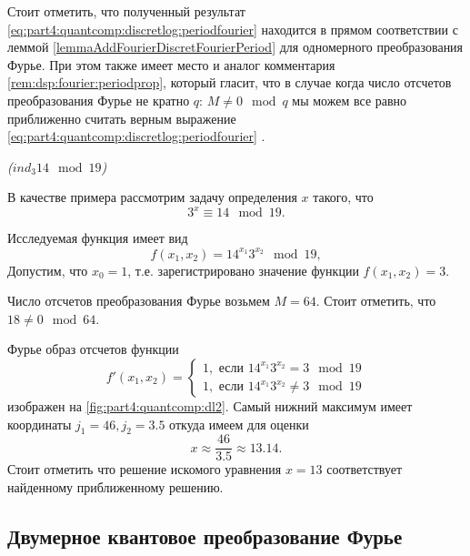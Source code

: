 Стоит отметить, что полученный результат
\eqref{eq:part4:quantcomp:discretlog:periodfourier} находится в прямом
соответствии с леммой \ref{lemmaAddFourierDiscretFourierPeriod} для
одномерного преобразования Фурье. При этом также имеет место и аналог
комментария \ref{rem:dsp:fourier:periodprop}, который гласит, что в
случае когда число отсчетов преобразования Фурье не кратно $q$: $M \ne
0 \mod q$ мы можем все равно приближенно считать верным выражение
\eqref{eq:part4:quantcomp:discretlog:periodfourier}
\cite{Proos:2003:SDL:2011528.2011531}.  

\begin{example}
\emph{($ind_3{14} \mod{19}$)}
%

В качестве примера рассмотрим задачу определения $x$ такого, что 
\[
3^x \equiv 14 \mod 19.
\]

Исследуемая функция имеет вид
\[
f(x_1, x_2) = 14^{x_1} 3^{x_2} \mod 19,
\]
Допустим, что $x_0 = 1$, т.е. зарегистрировано значение функции
$f(x_1, x_2) = 3$.



Число отсчетов преобразования Фурье возьмем $M=64$. Стоит отметить,
что $18 \ne 0 \mod 64$.

Фурье образ отсчетов функции 
\[
f'(x_1, x_2) = 
\begin{cases}
1, \mbox{ если } 14^{x_1} 3^{x_2} = 3 \mod 19 \\
1, \mbox{ если } 14^{x_1} 3^{x_2} \ne 3 \mod 19 
\end{cases}
\]
изображен на \autoref{fig:part4:quantcomp:dl2}. Самый нижний максимум
имеет координаты $j_1 = 46, j_2 = 3.5$ откуда имеем для оценки 
\[
x \approx \frac{46}{3.5} \approx 13.14.
\]
Стоит отметить что решение искомого уравнения $x = 13$ соответствует
найденному приближенному решению.
\label{ex:part4:quantcomp:discretlog:periodfinding2}
\end{example}



\subsection{Двумерное квантовое преобразование Фурье}




